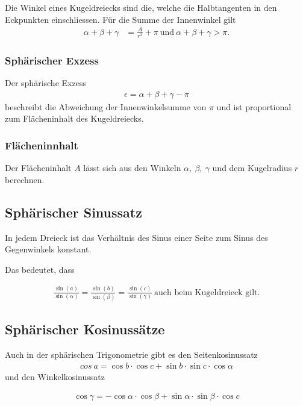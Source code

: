 Die Winkel eines Kugeldreiecks sind die, welche die Halbtangenten in den Eckpunkten einschliessen. 
Für die Summe der Innenwinkel gilt
\begin{align}
	\alpha+\beta+\gamma &= \frac{A}{r^2} + \pi \ \text{und} \ \alpha+\beta+\gamma > \pi. \nonumber
\end{align}
\subsubsection{Sphärischer Exzess}
Der sphärische Exzess
\begin{align}
	\epsilon = \alpha+\beta+\gamma - \pi \nonumber
\end{align}  
beschreibt die Abweichung der Innenwinkelsumme von $\pi$ und ist proportional zum Flächeninhalt des Kugeldreiecks.

\subsubsection{Flächeninnhalt}
Der Flächeninhalt $A$ lässt sich aus den Winkeln $\alpha,\ \beta, \ \gamma$ und dem Kugelradius $r$ berechnen.
\subsection{Sphärischer Sinussatz}
In jedem Dreieck ist das Verhältnis des Sinus einer Seite zum Sinus des Gegenwinkels konstant. 

Das bedeutet, dass

\begin{align}
	\frac{\sin (a)}{\sin (\alpha)} =\frac{\sin (b)}{\sin (\beta)} = \frac{\sin (c)}{\sin (\gamma)} \nonumber \ \text{auch beim Kugeldreieck gilt.}
\end{align}

\subsection{Sphärischer Kosinussätze}
Auch in der sphärischen Trigonometrie gibt es den Seitenkosinussatz
\begin{align}
	cos \ a = \cos b \cdot \cos c + \sin b \cdot \sin c \cdot \cos \alpha \nonumber
\end{align} %
und den Winkelkosinussatz

\begin{align}
	\cos \gamma = -\cos \alpha \cdot \cos \beta + \sin \alpha \cdot \sin \beta \cdot \cos c \nonumber
\end{align}

